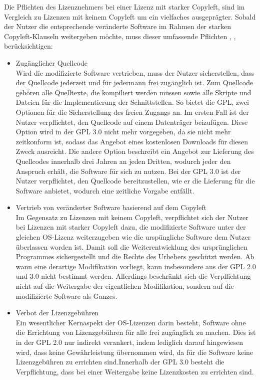 Die Pflichten des Lizenznehmers bei einer Lizenz mit starker Copyleft, sind im Vergleich zu Lizenzen mit keinem Copyleft um ein vielfaches ausgeprägter. Sobald der Nutzer die entsprechende veränderte Software im Rahmen der starken Copyleft-Klauseln weitergeben möchte, muss dieser umfassende Pflichten \cite[S.30 - 34]{allmann_open_2019}, \cite[S. 54 - 58]{schaaf_open-source-lizenzen_2013}, \cite[S. 63 - 65]{bitkom_open_2016} berücksichtigen: 

\begin{itemize}
    \item Zugänglicher Quellcode\\
    Wird die modifizierte Software vertrieben, muss der Nutzer sicherstellen, dass der Quellcode jederzeit und für jedermann frei zugänglich ist. Zum Quellcode gehören alle Quelltexte, die kompiliert werden müssen sowie alle Skripte und Dateien für die Implementierung der Schnittstellen. So bietet die GPL, zwei Optionen für die Sicherstellung des freien Zugangs an. Im ersten Fall ist der Nutzer verpflichtet, den Quellcode auf einem Datenträger beizufügen. Diese Option wird in der GPL 3.0 nicht mehr vorgegeben, da sie nicht mehr zeitkonform ist, sodass das Angebot eines kostenlosen Downloads für diesen Zweck ausreicht. Die andere Option beschreibt ein Angebot zur Lieferung des Quellcodes innerhalb drei Jahren an jeden Dritten, wodurch jeder den Anspruch erhält, die Software für sich zu nutzen. Bei der GPL 3.0 ist der Nutzer verpflichtet, den Quellcode bereitzustellen, wie er die Lieferung für die Software anbietet, wodurch eine zeitliche Vorgabe entfällt.  

    \item Vertrieb von veränderter Software basierend auf dem Copyleft\\
    Im Gegensatz zu Lizenzen mit keinem Copyleft, verpflichtet sich der Nutzer bei Lizenzen mit starker Copyleft dazu, die modifizierte Software unter der gleichen OS-Lizenz weiterzugeben wie die urspüngliche Software dem Nutzer überlassen worden ist. Damit soll die Weiterentwicklung des ursprünglichen Programmes sichergestellt und die Rechte des Urhebers geschützt werden. Ab wann eine derartige Modifikation vorliegt, kann insbesondere aus der GPL 2.0 und 3.0 nicht bestimmt werden. Allerdings beschränkt sich die Verpflichtung nicht auf die Weitergabe der eigentlichen Modifikation, sondern auf die modifizierte Software als Ganzes.

    \item Verbot der Lizenzgebühren\\
    Ein wesentlicher Kernaspekt der OS-Lizenzen darin besteht, Software ohne die Errichtung von Lizenzgebühren für alle frei zugänglich zu machen. Dies ist in der GPL 2.0 nur indirekt verankert, indem lediglich darauf hingewiesen wird, dass keine Gewährleistung übernommen wird, da für die Software keine Lizenzgebühren zu errichten sind.Innerhalb der GPL 3.0 besteht die Verpflichtung, dass bei einer Weitergabe keine Lizenzkosten zu errichten sind. 


\end{itemize}
